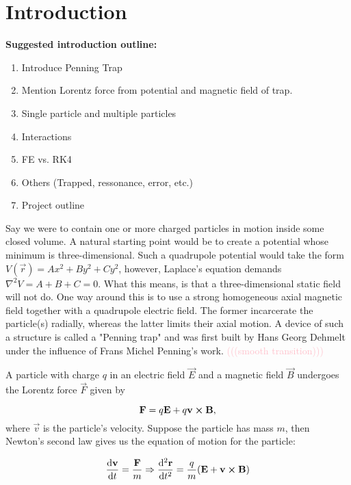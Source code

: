 \section{Introduction}\label{sec:introduction}


\textbf{Suggested introduction outline:}
\begin{enumerate}
    \item Introduce Penning Trap 
    \item Mention Lorentz force from potential and magnetic field of trap. 
    \item Single particle and multiple particles 
    \item Interactions 
    \item FE vs. RK4 
    \item Others (Trapped, ressonance, error, etc.)
    \item Project outline 
\end{enumerate}

Say we were to contain one or more charged particles in motion inside some closed volume. A natural starting point would be to create a potential whose minimum is three-dimensional. Such a quadrupole potential would take the form $V(\vec{r}) = Ax^2 + By^2 + Cy^2$, however, Laplace's equation demands $\nabla^{\! 2}V = A+ B+ C = 0$. What this means, is that a three-dimensional static field will not do. One way around this is to use a strong homogeneous axial magnetic field together with a quadrupole electric field. The former incarcerate the particle(s) radially, whereas the latter limits their axial motion. A device of such a structure is called a "Penning trap" and was first built by Hans Georg Dehmelt under the influence of Frans Michel Penning's work. \textcolor{pink}{(((smooth transition)))}


A particle with charge $q$ in an electric field $\vec{E}$ and a magnetic field $\vec{B}$ undergoes the Lorentz force $\vec{F}$ given by

\begin{equation}\label{eq:lorentz_force}
    \mathbf{F} = q\mathbf{E} + q \mathbf{v} \cross \mathbf{B},
\end{equation}
where $\vec{v}$ is the particle's velocity. Suppose the particle has mass $m$, then Newton's second law gives us the equation of motion for the particle:

\begin{equation}\label{eq:eom_lorentz}
 \dv{\mathbf{v}}{t} = \frac{\mathbf{F}}{m}  \Rightarrow \dv[2]{\mathbf{r}}{t}= \frac{q}{m} (\mathbf{E} + \mathbf{v} \cross \mathbf{B} ) 
\end{equation}


